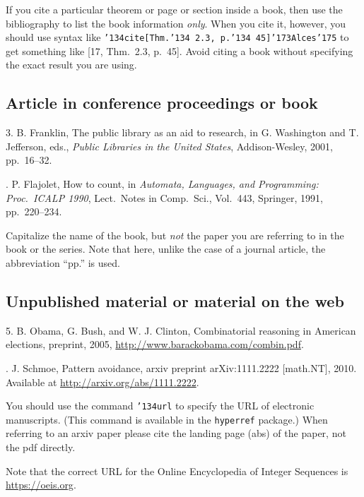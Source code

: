 \documentclass[12pt]{article}
\begin{document}
If you cite a particular theorem or page or section inside a book,
then use the bibliography to list the book information {\it only}.
When you cite it, however, you should use syntax like
{\tt \char'134cite[Thm.{\char'134} 2.3,
p.{\char'134} 45]\char'173Alces\char'175}
to get something like [17, Thm.\ 2.3, p.\ 45].  Avoid citing a book
without specifying the exact result you are using.

\subsection{Article in conference proceedings or book}

    3.  B. Franklin, The public library as an aid to research,
    in G. Washington and T. Jefferson, eds., {\it Public Libraries in
    the United States}, Addison-Wesley, 2001, pp.\ 16--32.

\medskip

.  P. Flajolet, How to count, in {\it Automata, Languages, and
    Programming:  Proc.\ ICALP 1990}, Lect.\ Notes in Comp.\ Sci.,
    Vol.\ 443, Springer, 1991, pp.\ 220--234.

\smallskip

Capitalize the name of the book,
but {\it not\/} the paper you are referring to
in the book or the series.
Note that here, unlike the case of a journal article, the
abbreviation ``pp.'' is used.

\subsection{Unpublished material or material on the web}

     5.  B. Obama, G. Bush, and W. J. Clinton,
     Combinatorial reasoning in American elections,
	 preprint, 2005,  \url{http://www.barackobama.com/combin.pdf}.

\medskip

.  J. Schmoe, Pattern avoidance, arxiv preprint arXiv:1111.2222 [math.NT], 2010. Available at \url{http://arxiv.org/abs/1111.2222}.

\smallskip

You should use the command {\tt \char'134url} to specify the URL of
electronic manuscripts.  (This command is available in
the {\tt hyperref} package.)  When referring to an arxiv paper please
cite the landing page (abs) of the paper, not the pdf directly.

Note that the correct URL for the Online
Encyclopedia of Integer Sequences is \url{https://oeis.org}.
\end{document}
